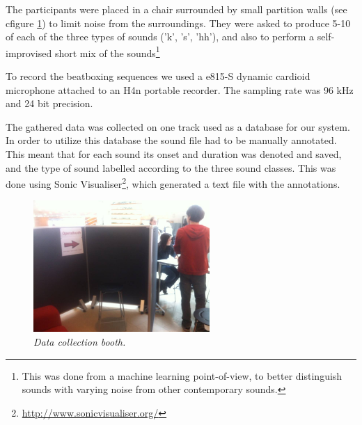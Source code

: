 	The participants were placed in a chair surrounded by small partition walls (see cfigure \ref{data-collection-pic}) to limit noise from the surroundings. They were asked to produce 5-10 of each of the three types of sounds ('k', 's', 'hh'), and also to perform a self-improvised short mix of the sounds\footnote{This was done from a machine learning point-of-view, to better distinguish sounds with varying noise from other contemporary sounds.}
	
	To record the beatboxing sequences we used a e815-S dynamic cardioid microphone attached to an H4n portable recorder. The sampling rate was 96 kHz and 24 bit precision.
	
	The gathered data was collected on one track used as a database for our system. In order to utilize this database the sound file had to be manually annotated. This meant that for each sound its onset and duration was denoted and saved, and the type of sound labelled according to the three sound classes. This was done using Sonic Visualiser\footnote{\url{http://www.sonicvisualiser.org/}}, which generated a text file with the annotations.
	
	\begin{figure}[h]
		\begin{center}
			\includegraphics[height=5cm]{tex/dataset_collection.JPG}
			\caption{\textit{{\footnotesize Data collection booth.}}}
			\label{data-collection-pic}
		\end{center}
	\end{figure}
	
	
